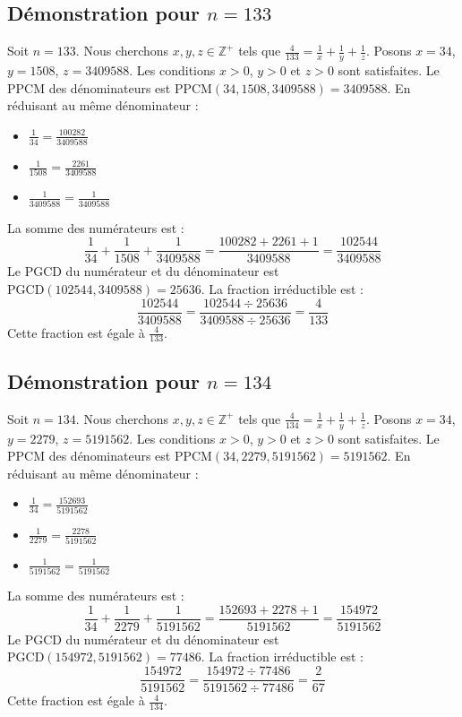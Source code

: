 \documentclass[11pt,a4paper]{article}
\begin{document}
\subsection{Démonstration pour $n = 133$}
Soit $n = 133$. Nous cherchons $x, y, z \in \mathbb{Z}^{+}$ tels que $\frac{4}{133} = \frac{1}{x} + \frac{1}{y} + \frac{1}{z}$.
Posons $x = 34$, $y = 1508$, $z = 3409588$.
Les conditions $x > 0$, $y > 0$ et $z > 0$ sont satisfaites.
Le PPCM des dénominateurs est $\text{PPCM}(34, 1508, 3409588) = 3409588$.
En réduisant au même dénominateur :
\begin{itemize}
    \item $\frac{1}{34} = \frac{100282}{3409588}$
    \item $\frac{1}{1508} = \frac{2261}{3409588}$
    \item $\frac{1}{3409588} = \frac{1}{3409588}$
\end{itemize}
La somme des numérateurs est :
$$ \frac{1}{34} + \frac{1}{1508} + \frac{1}{3409588} = \frac{100282 + 2261 + 1}{3409588} = \frac{102544}{3409588} $$
Le PGCD du numérateur et du dénominateur est $\text{PGCD}(102544, 3409588) = 25636$.
La fraction irréductible est :
$$ \frac{102544}{3409588} = \frac{102544 \div 25636}{3409588 \div 25636} = \frac{4}{133} $$
Cette fraction est égale à $\frac{4}{133}$.

\subsection{Démonstration pour $n = 134$}
Soit $n = 134$. Nous cherchons $x, y, z \in \mathbb{Z}^{+}$ tels que $\frac{4}{134} = \frac{1}{x} + \frac{1}{y} + \frac{1}{z}$.
Posons $x = 34$, $y = 2279$, $z = 5191562$.
Les conditions $x > 0$, $y > 0$ et $z > 0$ sont satisfaites.
Le PPCM des dénominateurs est $\text{PPCM}(34, 2279, 5191562) = 5191562$.
En réduisant au même dénominateur :
\begin{itemize}
    \item $\frac{1}{34} = \frac{152693}{5191562}$
    \item $\frac{1}{2279} = \frac{2278}{5191562}$
    \item $\frac{1}{5191562} = \frac{1}{5191562}$
\end{itemize}
La somme des numérateurs est :
$$ \frac{1}{34} + \frac{1}{2279} + \frac{1}{5191562} = \frac{152693 + 2278 + 1}{5191562} = \frac{154972}{5191562} $$
Le PGCD du numérateur et du dénominateur est $\text{PGCD}(154972, 5191562) = 77486$.
La fraction irréductible est :
$$ \frac{154972}{5191562} = \frac{154972 \div 77486}{5191562 \div 77486} = \frac{2}{67} $$
Cette fraction est égale à $\frac{4}{134}$.
\end{document}
